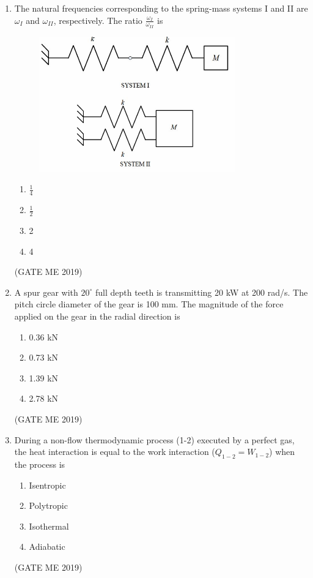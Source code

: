 \documentclass[journal]{IEEEtran}
\begin{document}
\begin{enumerate}
\item The natural frequencies corresponding to the spring-mass systems I and II are $\omega_I$ and $\omega_{II}$, respectively. The ratio $\frac{\omega_I}{\omega_{II}}$ is

\begin{figure}[H]
\centering
\includegraphics[width=0.8\textwidth]{Fig 4.png}
\caption{}
\label{fig:question6}
\end{figure}

\begin{multicols}{4}
\begin{enumerate}
    \item $\frac{1}{4}$
    \item $\frac{1}{2}$
    \item 2
    \item 4
\end{enumerate}
\end{multicols}
\hfill (GATE ME 2019)

\item A spur gear with $20^\circ$ full depth teeth is transmitting 20 kW at 200 rad/s. The pitch circle diameter of the gear is 100 mm. The magnitude of the force applied on the gear in the radial direction is
\begin{multicols}{4}
\begin{enumerate}
    \item 0.36 kN
    \item 0.73 kN
    \item 1.39 kN
    \item 2.78 kN
\end{enumerate}
\end{multicols}
\hfill (GATE ME 2019)

\item During a non-flow thermodynamic process (1-2) executed by a perfect gas, the heat interaction is equal to the work interaction ($Q_{1-2} = W_{1-2}$) when the process is
\begin{multicols}{2}
\begin{enumerate}
    \item Isentropic
    \item Polytropic
    \item Isothermal
    \item Adiabatic
\end{enumerate}
\end{multicols}
\hfill (GATE ME 2019)


\end{enumerate}
\end{document}

